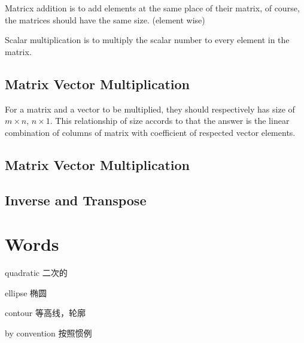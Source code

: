 \documentclass[en,11pt,english,black,simple]{../elegantbook}
\begin{document}
Matricx addition is to add elements at the same place of their matrix, of course, the matrices should have the same size. (element wise)

Scalar multiplication is to multiply the scalar number to every element in the matrix.



\subsection{Matrix Vector Multiplication}

For a matrix and a vector to be multiplied, they should respectively has size of \(m \times n\), \(n \times 1\). This relationship of size accords to that the answer is the linear combination of columns of matrix with coefficient of respected vector elements.


\subsection{Matrix Vector Multiplication}

\subsection{Inverse and Transpose}

\section*{Words}

quadratic 二次的

ellipse 椭圆

contour 等高线，轮廓

by convention 按照惯例

\let\chapname\undefined
\ifx\mainclass\undefined
\end{document}
